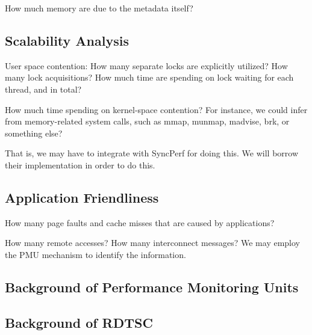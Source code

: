 How much memory are due to the metadata itself? 

\subsection{Scalability Analysis} 

User space contention:
How many separate locks are explicitly utilized? 
How many lock acquisitions? How much time are spending on lock waiting for each thread, and in total?

How much time spending on kernel-space contention? For instance, we could infer from memory-related system calls, such as mmap, munmap, madvise, brk, or something else? 

That is, we may have to integrate with SyncPerf for doing this. We will borrow their implementation in order to do this. 

\subsection{Application Friendliness} 
How many page faults and cache misses that are caused by applications? 

How many remote accesses? How many interconnect messages? We may employ the PMU mechanism to identify the information.


\subsection{Background of Performance Monitoring Units}
\label{sec:pmu}

\subsection{Background of RDTSC}

\label{sec:rdtsc}



